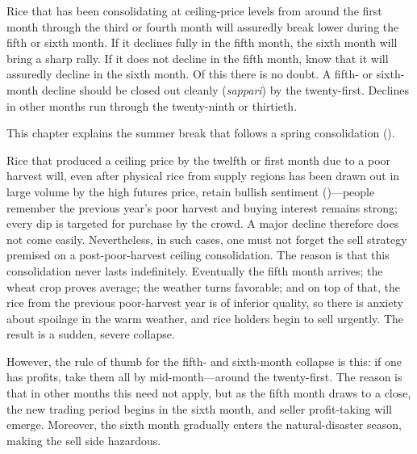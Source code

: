 
\begin{sokyubox}
{\small\itshape\color{sokyubar} }

\medskip
Rice that has been consolidating at ceiling-price levels from
around the first month through the third or fourth month will
assuredly break lower during the fifth or sixth month. If it
declines fully in the fifth month, the sixth month will bring a
sharp rally. If it does not decline in the fifth month, know that
it will assuredly decline in the sixth month. Of this there is no
doubt. A fifth- or sixth-month decline should be closed out
cleanly (\textit{sappari}) by the twenty-first. Declines in other months
run through the twenty-ninth or thirtieth.
\end{sokyubox}

\commentary
This chapter explains the summer break that follows a spring
consolidation ().

Rice that produced a ceiling price by the twelfth or first month
due to a poor harvest will, even after physical rice from supply
regions has been drawn out in large volume by the high futures
price, retain bullish sentiment ()---people remember
the previous year's poor harvest and buying interest remains
strong; every dip is targeted for purchase by the crowd. A major
decline therefore does not come easily. Nevertheless, in such
cases, one must not forget the sell strategy premised on a
post-poor-harvest ceiling consolidation. The reason is that this
consolidation never lasts indefinitely. Eventually the fifth month
arrives; the wheat crop proves average; the weather turns
favorable; and on top of that, the rice from the previous poor-harvest
year is of inferior quality, so there is anxiety about
spoilage in the warm weather, and rice holders begin to sell
urgently. The result is a sudden, severe collapse.

However, the rule of thumb for the fifth- and sixth-month collapse
is this: if one has profits, take them all by mid-month---around
the twenty-first. The reason is that in other months this need not
apply, but as the fifth month draws to a close, the new trading
period begins in the sixth month, and seller profit-taking will
emerge. Moreover, the sixth month gradually enters the natural-disaster
season, making the sell side hazardous.

